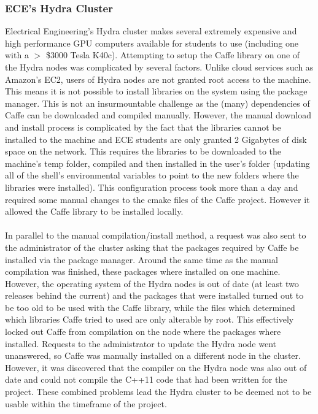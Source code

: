 \documentclass[12pt]{article}
\begin{document}
\subsubsection{ECE's Hydra Cluster}

	Electrical Engineering's Hydra cluster makes several extremely expensive and high performance GPU computers available for students to use (including one with a $>$ \$3000 Tesla K40c).  Attempting to setup the Caffe library on one of the Hydra nodes was complicated by several factors.  Unlike cloud services such as Amazon's EC2, users of Hydra nodes are not granted root access to the machine.  This means it is not possible to install libraries on the system using the package manager.  This is not an insurmountable challenge as the (many) dependencies of Caffe can be downloaded and compiled manually.  However, the manual download and install process is complicated by the fact that the libraries cannot be installed to the machine and ECE students are only granted 2 Gigabytes of disk space on the network.  This requires the libraries to be downloaded to the machine's temp folder, compiled and then installed in the user's folder (updating all of the shell's environmental variables to point to the new folders where the libraries were installed).  This configuration process took more than a day and required some manual changes to the cmake files of the Caffe project. However it allowed the Caffe library to be installed locally.\\
\\
	In parallel to the manual compilation/install method, a request was also sent to the administrator of the cluster asking that the packages required by Caffe be installed via the package manager.  Around the same time as the manual compilation was finished, these packages where installed on one machine.  However, the operating system of the Hydra nodes is out of date (at least two releases behind the current) and the packages that were installed turned out to be too old to be used with the Caffe library, while the files which determined which libraries Caffe tried to used are only alterable by root.  This effectively locked out Caffe from compilation on the node where the packages where installed.  Requests to the administrator to update the Hydra node went unanswered, so Caffe was manually installed on a different node in the cluster.  However, it was discovered that the compiler on the Hydra node was also out of date and could not compile the C++11 code that had been written for the project.  These combined problems lead the Hydra cluster to be deemed not to be usable within the timeframe of the project.
\end{document}
